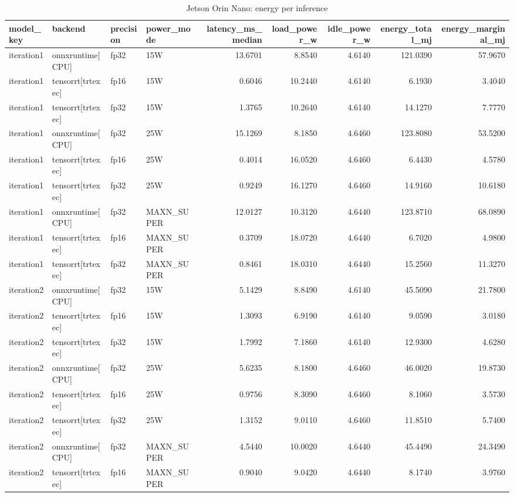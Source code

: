 \begin{table}
\caption{Jetson Orin Nano: energy per inference}
\begin{tabular}{llllrrrrr}
\toprule
model\_key & backend & precision & power\_mode & latency\_ms\_median & load\_power\_w & idle\_power\_w & energy\_total\_mj & energy\_marginal\_mj \\
\midrule
iteration1 & onnxruntime[CPU] & fp32 & 15W & 13.6701 & 8.8540 & 4.6140 & 121.0390 & 57.9670 \\
iteration1 & tensorrt[trtexec] & fp16 & 15W & 0.6046 & 10.2440 & 4.6140 & 6.1930 & 3.4040 \\
iteration1 & tensorrt[trtexec] & fp32 & 15W & 1.3765 & 10.2640 & 4.6140 & 14.1270 & 7.7770 \\
iteration1 & onnxruntime[CPU] & fp32 & 25W & 15.1269 & 8.1850 & 4.6460 & 123.8080 & 53.5200 \\
iteration1 & tensorrt[trtexec] & fp16 & 25W & 0.4014 & 16.0520 & 4.6460 & 6.4430 & 4.5780 \\
iteration1 & tensorrt[trtexec] & fp32 & 25W & 0.9249 & 16.1270 & 4.6460 & 14.9160 & 10.6180 \\
iteration1 & onnxruntime[CPU] & fp32 & MAXN\_SUPER & 12.0127 & 10.3120 & 4.6440 & 123.8710 & 68.0890 \\
iteration1 & tensorrt[trtexec] & fp16 & MAXN\_SUPER & 0.3709 & 18.0720 & 4.6440 & 6.7020 & 4.9800 \\
iteration1 & tensorrt[trtexec] & fp32 & MAXN\_SUPER & 0.8461 & 18.0310 & 4.6440 & 15.2560 & 11.3270 \\
iteration2 & onnxruntime[CPU] & fp32 & 15W & 5.1429 & 8.8490 & 4.6140 & 45.5090 & 21.7800 \\
iteration2 & tensorrt[trtexec] & fp16 & 15W & 1.3093 & 6.9190 & 4.6140 & 9.0590 & 3.0180 \\
iteration2 & tensorrt[trtexec] & fp32 & 15W & 1.7992 & 7.1860 & 4.6140 & 12.9300 & 4.6280 \\
iteration2 & onnxruntime[CPU] & fp32 & 25W & 5.6235 & 8.1800 & 4.6460 & 46.0020 & 19.8730 \\
iteration2 & tensorrt[trtexec] & fp16 & 25W & 0.9756 & 8.3090 & 4.6460 & 8.1060 & 3.5730 \\
iteration2 & tensorrt[trtexec] & fp32 & 25W & 1.3152 & 9.0110 & 4.6460 & 11.8510 & 5.7400 \\
iteration2 & onnxruntime[CPU] & fp32 & MAXN\_SUPER & 4.5440 & 10.0020 & 4.6440 & 45.4490 & 24.3490 \\
iteration2 & tensorrt[trtexec] & fp16 & MAXN\_SUPER & 0.9040 & 9.0420 & 4.6440 & 8.1740 & 3.9760 \\

\end{tabular}
\end{table}
